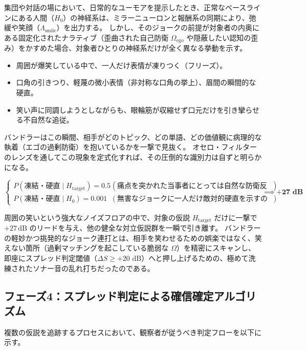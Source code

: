 集団や対話の場において、日常的なユーモアを提示したとき、正常なベースラインにある人間（$H_0$）の神経系は、ミラーニューロンと報酬系の同期により、弛緩や笑顔（$\Lambda_{\mathrm{smile}}$）を出力する。
しかし、そのジョークの前提が対象者の内奥にある固定化されたナラティブ（歪曲された自己防衛 $\Omega_{\mathrm{ego}}$ や隠蔽したい認知の歪み）をかすめた場合、対象者ひとりの神経系だけが全く異なる挙動を示す。

\begin{itemize}
\item 周囲が爆笑している中で、一人だけ表情が凍りつく（フリーズ）。
\item 口角の引きつり、軽蔑の微小表情（非対称な口角の挙上）、眉間の瞬間的な硬直。
\item 笑い声に同調しようとしながらも、眼輪筋が収縮せず口元だけを引き攣らせる不自然な追従。
\end{itemize}

バンドラーはこの瞬間、相手がどのトピック、どの単語、どの価値観に病理的な執着（エゴの過剰防衛）を抱いているかを一撃で見抜く。
オセロ・フィルターのレンズを通してこの現象を定式化すれば、その圧倒的な識別力は自ずと明らかになる。

\begin{equation}
\begin{cases}
P(\text{凍結・硬直} \mid H_{\mathrm{target}}) = 0.5 & (\text{痛点を突かれた当事者にとっては自然な防衛反応}) \\
P(\text{凍結・硬直} \mid H_0) = 0.001 & (\text{無害なジョークに一人だけ敵対的硬直を示すのは極めて稀})
\end{cases}
\implies \mathbf{+27\text{ dB}}
\end{equation}

周囲の笑いという強大なノイズフロアの中で、対象の仮説 $H_{\mathrm{target}}$ だけに一撃で $+27\,\mathrm{dB}$ のリードを与え、他の健全な対立仮説群を一瞬で引き離す。
バンドラーの軽妙かつ挑発的なジョーク連打とは、相手を笑わせるための娯楽ではなく、笑えない箇所（過剰マッチングを起こしている脆弱な $\Omega$）を精密にスキャンし、即座にスプレッド判定閾値（$\Delta S \ge +20\text{ dB}$）へと押し上げるための、極めて洗練されたソナー音の乱れ打ちだったのである。

\subsection{フェーズ4：スプレッド判定による確信確定アルゴリズム}
複数の仮説を追跡するプロセスにおいて、観察者が従うべき判定フローを以下に示す。

